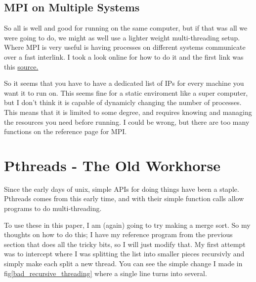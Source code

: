 \documentclass[12pt]{article}
\begin{document}
\subsection{MPI on Multiple Systems}

So all is well and good for running on the same computer, but if that was all we were going to do, we might as well use a lighter weight multi-threading setup.
Where MPI is very useful is having processes on different systems communicate over a fast interlink.
I took a look online for how to do it and the first link was this
\hyperlink{http://mpitutorial.com/tutorials/running-an-mpi-cluster-within-a-lan/}{source.}

So it seems that you have to have a dedicated list of IPs for every machine you want it to run on.
This seems fine for a static enviroment like a super computer, but I don't think it is capable of dynamicly changing the number of processes.
This means that it is limited to some degree, and requires knowing and managing the resources you need before running.
I could be wrong, but there are too many functions on the reference page for MPI.

\section{Pthreads - The Old Workhorse}

Since the early days of unix, simple APIs for doing things have been a staple.
Pthreads comes from this early time, and with their simple function calls allow programs to do multi-threading.

To use these in this paper, I am (again) going to try making a merge sort.
So my thoughts on how to do this; I have my reference program from the previous section that does all the tricky bits, so I will just modify that.
My first attempt was to intercept where I was splitting the list into smaller pieces recursivly and simply make each split a new thread.
You can see the simple change I made in fig\ref{bad_recursive_threading} where a single line turns into several.
\end{document}
